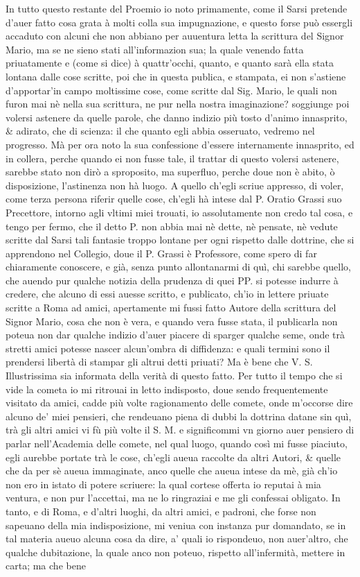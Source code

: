 \documentclass[11pt,twoside,openany]{book}
\begin{document}
In tutto questo restante del Proemio io noto primamente, come il Sarsi pretende d'auer fatto cosa grata à molti colla sua impugnazione, e questo forse può essergli accaduto con alcuni che non abbiano per auuentura letta la scrittura del Signor Mario, ma se ne sieno stati all'informazion sua; la quale venendo fatta priuatamente e (come si dice) à quattr'occhi, quanto, e quanto sarà ella stata lontana dalle cose scritte, poi che in questa publica, e stampata, ei non s'astiene d'apportar'in campo moltissime cose, come scritte dal Sig. Mario, le quali non furon mai nè nella sua scrittura, ne pur nella nostra imaginazione? soggiunge poi volersi astenere da quelle parole, che danno indizio più tosto d'animo innasprito, \& adirato, che di scienza: il che quanto egli abbia osseruato, vedremo nel progresso. Mà per ora noto la sua confessione d'essere internamente innasprito, ed in collera, perche quando ei non fusse tale, il trattar di questo volersi astenere, sarebbe stato non dirò a sproposito, ma superfluo, perche doue non è abito, ò disposizione, l'astinenza non hà luogo. A quello ch'egli scriue appresso, di voler, come terza persona riferir quelle cose, ch'egli hà intese dal P. Oratio Grassi suo Precettore, intorno agli vltimi miei trouati, io assolutamente non credo tal cosa, e tengo per fermo, che il detto P. non abbia mai nè dette, nè pensate, nè vedute scritte dal Sarsi tali fantasie troppo lontane per ogni rispetto dalle dottrine, che si apprendono nel Collegio, doue il P. Grassi è Professore, come spero di far chiaramente conoscere, e già, senza punto allontanarmi di quì, chi sarebbe quello, che auendo pur qualche notizia della prudenza di quei PP. si potesse indurre à credere, che alcuno di essi auesse scritto, e publicato, ch'io in lettere priuate scritte a Roma ad amici, apertamente mi fussi fatto Autore della scrittura del Signor Mario, cosa che non è vera, e quando vera fusse stata, il publicarla non poteua non dar qualche indizio d'auer piacere di sparger qualche seme, onde trà stretti amici potesse nascer alcun'ombra di diffidenza: e quali termini sono il prendersi libertà di stampar gli altrui detti priuati? Ma è bene che V. S. Illustrissima sia informata della verità di questo fatto. Per tutto il tempo che si vide la cometa io mi ritrouai in letto indisposto, doue sendo frequentemente visitato da amici, cadde più volte ragionamento delle comete, onde m'occorse dire alcuno de' miei pensieri, che rendeuano piena di dubbi la dottrina datane sin quì, trà gli altri amici vi fù più volte il S. M. e significommi vn giorno auer pensiero di parlar nell'Academia delle comete, nel qual luogo, quando così mi fusse piaciuto, egli aurebbe portate trà le cose, ch'egli aueua raccolte da altri Autori, \& quelle che da per sè aueua immaginate, anco quelle che aueua intese da mè, già ch'io non ero in istato di potere scriuere: la qual cortese offerta io reputai à mia ventura, e non pur l'accettai, ma ne lo ringraziai e me gli confessai obligato. In tanto, e di Roma, e d'altri luoghi, da altri amici, e padroni, che forse non sapeuano della mia indisposizione, mi veniua con instanza pur domandato, se in tal materia aueuo alcuna cosa da dire, a' quali io rispondeuo, non auer'altro, che qualche dubitazione, la quale anco non poteuo, rispetto all'infermità, mettere in carta; ma che bene 
\end{document}
